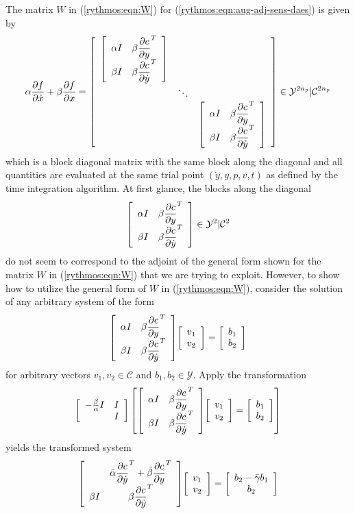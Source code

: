 \documentclass[pdf,ps2pdf,11pt]{SANDreport}
\begin{document}
The matrix $W$ in (\ref{rythmos:eqn:W}) for
(\ref{rythmos:eqn:aug-adj-sens-daes}) is given by
%
\begin{equation}
\alpha \Jac{f}{\dot{x}} + \beta \Jac{f}{x}
= 
{\bmat{ccc}
%
{\bmat{cc}
\alpha I & \beta \Jac{c}{y}^T \\
\beta I &  \beta \Jac{c}{\dot{y}}^T
\emat} \\
%
& \ddots \\
%
& & {\bmat{cc}
\alpha I & \beta \Jac{c}{y}^T \\
\beta I &  \beta \Jac{c}{\dot{y}}^T
\emat}
%
\emat}
\in \mathcal{Y}^{2 n_p}|\mathcal{C}^{2 n_p}
\label{rythmos:eqn:aug-adj-sens-daes-jac}
\end{equation}
%
which is a block diagonal matrix with the same block along the diagonal and
all quantities are evaluated at the same trial point $(\dot{y},y,p,v,t)$ as
defined by the time integration algorithm.  At first glance, the blocks along
the diagonal
%
\begin{equation}
{\bmat{cc}
\alpha I & \beta \Jac{c}{y}^T \\
\beta I &  \beta \Jac{c}{\dot{y}}^T
\emat} \in \mathcal{Y}^{2}|\mathcal{C}^{2}
\label{rythmos:eqn:aug-adj-sens-jac}
\end{equation}
%
do not seem to correspond to the adjoint of the general form shown for the
matrix $W$ in (\ref{rythmos:eqn:W}) that we are trying to exploit.  However,
to show how to utilize the general form of $W$ in (\ref{rythmos:eqn:W}),
consider the solution of any arbitrary system of the form
%
\begin{equation}
{\bmat{cc}
\alpha I & \beta \Jac{c}{y}^T \\
\beta I &  \beta \Jac{c}{\dot{y}}^T
\emat}
{\bmat{c} v_1 \\ v_2 \emat}
=
{\bmat{c} b_1 \\ b_2 \emat}
\label{rythmos:eqn:aug-adj-sens-system}
\end{equation}
%
for arbitrary vectors $v_1, v_2 {}\in\mathcal{C}$ and $b_1, b_2
{}\in\mathcal{Y}$.  Apply the transformation
%
\[
{\bmat{cc}
-\frac{\beta}{\alpha} I & I \\
 & I
\emat}
\left[
{\bmat{cc}
\alpha I & \beta \Jac{c}{y}^T \\
\beta I &  \beta \Jac{c}{\dot{y}}^T
\emat}
{\bmat{c} v_1 \\ v_2 \emat}
=
{\bmat{c} b_1 \\ b_2 \emat}
\right]
\]
%
yields the transformed system
%
\begin{equation}
{\bmat{cc}
 & \bar{\alpha} \Jac{c}{\dot{y}}^T + \bar{\beta} \Jac{c}{y}^T \\
\beta I &  \beta \Jac{c}{\dot{y}}^T
\emat}
{\bmat{c} v_1 \\ v_2 \emat}
=
{\bmat{c}  b_2 - \bar{\gamma} b_1 \\ b_2 \emat}
\label{rythmos:eqn:aug-adj-sens-trans-system}
\end{equation}
\end{document}

